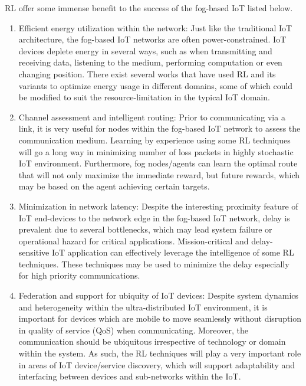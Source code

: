 \documentclass[journal]{IEEEtran}
\begin{document}
RL offer some immense benefit to the success of the fog-based IoT listed below.
\indent
    \begin{enumerate}[leftmargin=*,label= \arabic*)]
      \item Efficient energy utilization within the network: Just like the traditional IoT architecture, the fog-based IoT networks are often power-constrained. IoT devices deplete energy in several ways, such as when transmitting and receiving data, listening to the medium, performing computation or even changing position. There exist several works that have used RL and its variants to optimize energy usage in different domains, some of which could be modified to suit the resource-limitation in the typical IoT domain.
      
      \item Channel assessment and intelligent routing: Prior to communicating via a link, it is very useful for nodes within the fog-based IoT network to assess the communication medium. Learning by experience using some RL techniques will go a long way in minimizing number of loss packets in highly stochastic IoT environment. Furthermore, fog nodes/agents can learn the optimal route that will not only maximize the immediate reward, but future rewards, which may be based on the agent achieving certain targets.  
      
      \item Minimization in network latency: Despite the interesting proximity feature of IoT end-devices to the network edge in the fog-based IoT network, delay is prevalent due to several bottlenecks, which may lead system failure or operational hazard for critical applications. Mission-critical and delay-sensitive IoT application can effectively leverage the intelligence of some RL techniques. These techniques may be used to minimize the delay especially for high priority communications.
            
      \item Federation and support for ubiquity of IoT devices: Despite system dynamics and heterogeneity within the ultra-distributed IoT environment, it is important for devices which are mobile to move seamlessly without disruption in quality of service (QoS) when communicating. Moreover, the communication should be ubiquitous irrespective of technology or domain within the system. As such, the RL techniques will play a very important role in areas of IoT device/service discovery, which will support adaptability and interfacing between devices and sub-networks within the IoT. 
      
      
    \end{enumerate}
\end{document}
